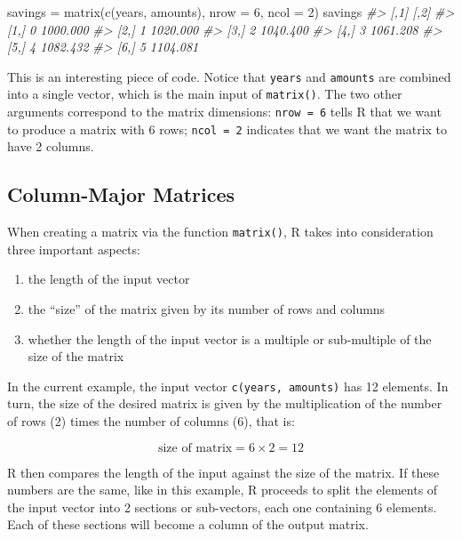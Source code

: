 \documentclass[
]{book}
\newenvironment{Shaded}{\begin{snugshade}}{\end{snugshade}}
\newcommand{\AttributeTok}[1]{\textcolor[rgb]{0.77,0.63,0.00}{#1}}
\newcommand{\CommentTok}[1]{\textcolor[rgb]{0.56,0.35,0.01}{\textit{#1}}}
\newcommand{\DecValTok}[1]{\textcolor[rgb]{0.00,0.00,0.81}{#1}}
\newcommand{\FunctionTok}[1]{\textcolor[rgb]{0.00,0.00,0.00}{#1}}
\newcommand{\NormalTok}[1]{#1}
\newcommand{\OtherTok}[1]{\textcolor[rgb]{0.56,0.35,0.01}{#1}}
\begin{document}
\begin{Shaded}
\begin{Highlighting}[]
\NormalTok{savings }\OtherTok{=} \FunctionTok{matrix}\NormalTok{(}\FunctionTok{c}\NormalTok{(years, amounts), }\AttributeTok{nrow =} \DecValTok{6}\NormalTok{, }\AttributeTok{ncol =} \DecValTok{2}\NormalTok{)}
\NormalTok{savings}
\CommentTok{\#\textgreater{}      [,1]     [,2]}
\CommentTok{\#\textgreater{} [1,]    0 1000.000}
\CommentTok{\#\textgreater{} [2,]    1 1020.000}
\CommentTok{\#\textgreater{} [3,]    2 1040.400}
\CommentTok{\#\textgreater{} [4,]    3 1061.208}
\CommentTok{\#\textgreater{} [5,]    4 1082.432}
\CommentTok{\#\textgreater{} [6,]    5 1104.081}
\end{Highlighting}
\end{Shaded}

This is an interesting piece of code. Notice that \texttt{years} and \texttt{amounts} are
combined into a single vector, which is the main input of \texttt{matrix()}. The two
other arguments correspond to the matrix dimensions: \texttt{nrow\ =\ 6} tells R that
we want to produce a matrix with 6 rows; \texttt{ncol\ =\ 2} indicates that we want the
matrix to have 2 columns.

\hypertarget{column-major-matrices}{%
\subsection{Column-Major Matrices}\label{column-major-matrices}}

When creating a matrix via the function \texttt{matrix()}, R takes into consideration
three important aspects:

\begin{enumerate}
\def\labelenumi{\arabic{enumi})}
\item
  the length of the input vector
\item
  the ``size'' of the matrix given by its number of rows and columns
\item
  whether the length of the input vector is a multiple or sub-multiple of the
  size of the matrix
\end{enumerate}

In the current example, the input vector \texttt{c(years,\ amounts)} has 12 elements.
In turn, the size of the desired matrix is given by the multiplication of the
number of rows (2) times the number of columns (6), that is:

\[
\text{size of matrix} = 6 \times 2 = 12
\]

R then compares the length of the input against the size of the matrix. If
these numbers are the same, like in this example, R proceeds to split the
elements of the input vector into 2 sections or sub-vectors, each one
containing 6 elements. Each of these sections will become a column of the
output matrix.
\end{document}
